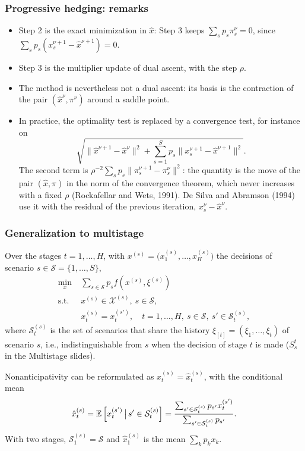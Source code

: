 \documentclass[aspectratio=169]{beamer}
\def\cS{\mathcal{S}}
\def\cX{\mathcal{X}}
\begin{document}
\begin{frame}
\frametitle{Progressive hedging: remarks}

\begin{itemize}
\item
Step 2 is the exact minimization in $\hat{x}$: Step 3 keeps $\sum_s p_s \pi_s^{\nu} = 0$, since $\sum_s p_s \left( x_s^{\nu+1} - \hat{x}^{\nu+1} \right) = 0$.
\item
Step 3 is the multiplier update of dual ascent, with the step $\rho$.
\item
The method is nevertheless not a dual ascent: its basis is the contraction of the pair $(\hat{x}^{\nu}, \pi^{\nu})$ around a saddle point.
\item
In practice, the optimality test is replaced by a convergence test, for instance on
\[
\sqrt{ \| \hat{x}^{\nu+1} - \hat{x}^{\nu} \|^2 + \sum_{s = 1}^S p_s \|
  x_s^{\nu+1} - \hat{x}^{\nu+1}\|^2}.
\]
The second term is $\rho^{-2} \sum_s p_s \| \pi_s^{\nu+1} - \pi_s^{\nu} \|^2$: the quantity is the move of the pair $(\hat{x}, \pi)$ in the norm of the convergence theorem, which never increases with a fixed $\rho$ (Rockafellar and Wets, 1991). De Silva and Abramson (1994) use it with the residual of the previous iteration, $x_s^{\nu} - \hat{x}^{\nu}$.
\end{itemize}

\end{frame}

\begin{frame}
\frametitle{Generalization to multistage}

{\small
Over the stages $t = 1, \ldots, H$, with $x^{(s)} = \bigl(x_1^{(s)}, \ldots, x_H^{(s)}\bigr)$ the decisions of scenario $s \in \cS = \lbrace 1, \ldots, S \rbrace$,
$$
\begin{aligned}
\min_{x}\; & \sum_{s \in \cS} p_s f\left(x^{(s)}, \xi^{(s)}\right)\\
\text{s.t. } & x^{(s)} \in \cX^{(s)},\ s \in \cS,\\
& x_t^{(s)} = x_t^{(s')},\quad t = 1, \ldots, H,\ s \in \cS,\ s' \in \cS_t^{(s)},
\end{aligned}
$$
where $\cS_t^{(s)}$ is the set of scenarios that share the history $\xi_{[t]} = (\xi_1, \ldots, \xi_t)$ of scenario $s$, i.e., indistinguishable from $s$ when the decision of stage $t$ is made ($S_s^t$ in the Multistage slides).

\medskip

Nonanticipativity can be reformulated as $x_t^{(s)} = \hat{x}_t^{(s)}$, with the conditional mean
$$
\hat{x}_t^{(s)} = \EE\left[ x_t^{(s')} \,\big|\, s' \in \cS_t^{(s)} \right] = \frac{\sum_{s' \in \cS_{t}^{(s)}} p_{s'} x_t^{(s')}}{\sum_{s' \in \cS_t^{(s)}} p_{s'}}.
$$
With two stages, $\cS_1^{(s)} = \cS$ and $\hat{x}_1^{(s)}$ is the mean $\sum_k p_k x_k$.
}

\end{frame}
\end{document}
